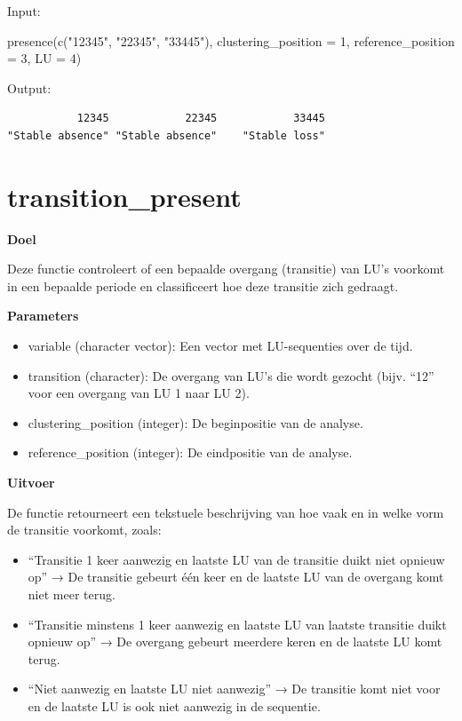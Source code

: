 \documentclass[twoside]{extreport}
\newenvironment{Shaded}{\begin{snugshade}}{\end{snugshade}}
\newcommand{\AttributeTok}[1]{\textcolor[rgb]{0.40,0.45,0.13}{#1}}
\newcommand{\DecValTok}[1]{\textcolor[rgb]{0.68,0.00,0.00}{#1}}
\newcommand{\FunctionTok}[1]{\textcolor[rgb]{0.28,0.35,0.67}{#1}}
\newcommand{\NormalTok}[1]{\textcolor[rgb]{0.00,0.23,0.31}{#1}}
\newcommand{\StringTok}[1]{\textcolor[rgb]{0.13,0.47,0.30}{#1}}
\providecommand{\tightlist}{%
  \setlength{\itemsep}{0pt}\setlength{\parskip}{0pt}}\usepackage{longtable,booktabs,array}
\begin{document}
Input:

\begin{Shaded}
\begin{Highlighting}[]
\FunctionTok{presence}\NormalTok{(}\FunctionTok{c}\NormalTok{(}\StringTok{"12345"}\NormalTok{, }\StringTok{"22345"}\NormalTok{, }\StringTok{"33445"}\NormalTok{), }\AttributeTok{clustering\_position =} \DecValTok{1}\NormalTok{,}
         \AttributeTok{reference\_position =} \DecValTok{3}\NormalTok{, }\AttributeTok{LU =} \DecValTok{4}\NormalTok{)}
\end{Highlighting}
\end{Shaded}

Output:

\begin{verbatim}
           12345            22345            33445 
"Stable absence" "Stable absence"    "Stable loss" 
\end{verbatim}

\section{transition\_present}\label{transition_present}

\textbf{Doel}

Deze functie controleert of een bepaalde overgang (transitie) van LU's
voorkomt in een bepaalde periode en classificeert hoe deze transitie
zich gedraagt.

\textbf{Parameters}

\begin{itemize}
\tightlist
\item
  variable (character vector): Een vector met LU-sequenties over de
  tijd.
\item
  transition (character): De overgang van LU's die wordt gezocht (bijv.
  ``12'' voor een overgang van LU 1 naar LU 2).
\item
  clustering\_position (integer): De beginpositie van de analyse.
\item
  reference\_position (integer): De eindpositie van de analyse.
\end{itemize}

\textbf{Uitvoer}

De functie retourneert een tekstuele beschrijving van hoe vaak en in
welke vorm de transitie voorkomt, zoals:

\begin{itemize}
\tightlist
\item
  ``Transitie 1 keer aanwezig en laatste LU van de transitie duikt niet
  opnieuw op'' → De transitie gebeurt één keer en de laatste LU van de
  overgang komt niet meer terug.
\item
  ``Transitie minstens 1 keer aanwezig en laatste LU van laatste
  transitie duikt opnieuw op'' → De overgang gebeurt meerdere keren en
  de laatste LU komt terug.
\item
  ``Niet aanwezig en laatste LU niet aanwezig'' → De transitie komt niet
  voor en de laatste LU is ook niet aanwezig in de sequentie.
\end{itemize}
\end{document}

